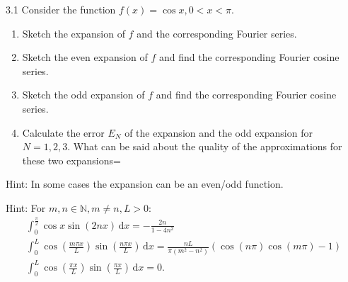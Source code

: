 
\begin{problem}{3.1}
Consider the function $f(x) = \cos x, 0<x<\pi$.

\begin{enumerate}[label=\alph*)]
  \item Sketch the expansion of $f$ and the corresponding Fourier series.
  \item Sketch the even expansion of $f$ and find the corresponding Fourier cosine series.
  \item Sketch the odd expansion of $f$ and find the corresponding Fourier cosine series.
  \item Calculate the error $E_N$ of the expansion and the odd expansion for $N = 1,2,3.$
    What can be said about the quality of the approximations for these two expansions=
\end{enumerate}
Hint: In some cases the expansion can be an even/odd function.

Hint: For $m, n \in \mathbb{N}, m \neq n, L > 0$:
\begin{gather*}
  \int_{0}^{\frac{\pi}{2}} \cos x \sin(2nx) \, \mathrm{d}x = - \frac{2n}{1 - 4 n^2} \\
  \int_{0}^{L} \cos \left( \frac{m \pi x}{L} \right) \sin \left( \frac{n \pi x}{L} \right) \, \mathrm{d}x  = \frac{nL}{\pi \left( m^2 - n^2 \right)} \left( \cos \left( n \pi  \right) \cos \left( m \pi \right) - 1 \right) \\
  \int_{0}^{L} \cos \left( \frac{\pi x}{L} \right) \sin \left( \frac{\pi x}{L} \right) \, \mathrm{d}x = 0
.\end{gather*}
\end{problem}

